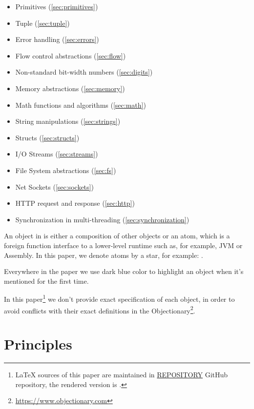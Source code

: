 \documentclass[sigplan,11pt,nonacm]{acmart}
\newcommand\aff[1]{\ff{\textcolor{gray}{$\star$}#1}}
\begin{document}
\begin{itemize}
    \item Primitives (\cref{sec:primitives})
    \item Tuple (\cref{sec:tuple})
    \item Error handling (\cref{sec:errors})
    \item Flow control abstractions (\cref{sec:flow})
    \item Non-standard bit-width numbers (\cref{sec:digits})
    \item Memory abstractions (\cref{sec:memory})
    \item Math functions and algorithms (\cref{sec:math})
    \item String manipulations (\cref{sec:strings})
    \item Structs (\cref{sec:structs})
    \item I/O Streams (\cref{sec:streams})
    \item File System abstractions (\cref{sec:fs})
    \item Net Sockets (\cref{sec:sockets})
    \item HTTP request and response (\cref{sec:http})
    \item Synchronization in multi-threading (\cref{sec:synchronization})
\end{itemize}

An object in \eolang{} is either a composition of other objects or an atom, which is a
foreign function interface to a lower-level runtime such as, for example, JVM
or Assembly. In this paper, we denote atoms by a star, for example:
\aff{times}.

Everywhere in the paper we use dark blue color to highlight an object when it's
mentioned for the first time.

In this paper\footnote{%
\LaTeX{} sources of this paper are maintained in
\href{https://github.com/REPOSITORY}{REPOSITORY} GitHub repository,
the rendered version is \href{https://github.com/REPOSITORY/releases/tag/0.0.0}{}.}
we don't provide exact specification of each object, in order to avoid
conflicts with their exact definitions in the
Objectionary\footnote{\url{https://www.objectionary.com}}.

\section{Principles}
\end{document}
